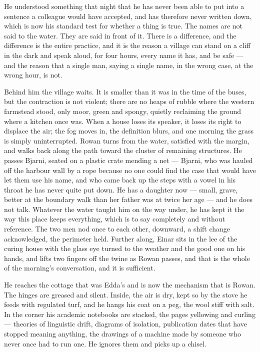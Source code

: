\documentclass[11pt,oneside]{book}
\begin{document}
He understood something that night that he has never been able to put
into a sentence a colleague would have accepted, and has therefore never
written down, which is now his standard test for whether a thing is
true. The names are not said to the water. They are said in front of it.
There is a difference, and the difference is the entire practice, and it
is the reason a village can stand on a cliff in the dark and speak
aloud, for four hours, every name it has, and be safe --- and the reason
that a single man, saying a single name, in the wrong case, at the wrong
hour, is not.

Behind him the village waits. It is smaller than it was in the time of
the buses, but the contraction is not violent; there are no heaps of
rubble where the western farmstead stood, only moor, green and spongy,
quietly reclaiming the ground where a kitchen once was. When a house
loses its speaker, it loses its right to displace the air; the fog moves
in, the definition blurs, and one morning the grass is simply
uninterrupted. Rowan turns from the water, satisfied with the margin,
and walks back along the path toward the cluster of remaining
structures. He passes Bjarni, seated on a plastic crate mending a net
--- Bjarni, who was hauled off the harbour wall by a rope because no one
could find the case that would have let them use his name, and who came
back up the steps with a vowel in his throat he has never quite put
down. He has a daughter now --- small, grave, better at the boundary
walk than her father was at twice her age --- and he does not talk.
Whatever the water taught him on the way under, he has kept it the way
this place keeps everything, which is to say completely and without
reference. The two men nod once
to each other, downward, a shift change acknowledged, the perimeter
held. Further along, Einar sits in the lee of the curing house with the
glass eye turned to the weather and the good one on his hands, and lifts
two fingers off the twine as Rowan passes, and that is the whole of the
morning's conversation, and it is sufficient.

He reaches the cottage that was Edda's and is now the mechanism that is
Rowan. The hinges are greased and silent. Inside, the air is dry, kept
so by the stove he feeds with regulated turf, and he hangs his coat on a
peg, the wool stiff with salt. In the corner his academic notebooks are
stacked, the pages yellowing and curling --- theories of linguistic
drift, diagrams of isolation, publication dates that have stopped
meaning anything, the drawings of a machine made by someone who never
once had to run one. He ignores them and picks up a chisel.
\end{document}
